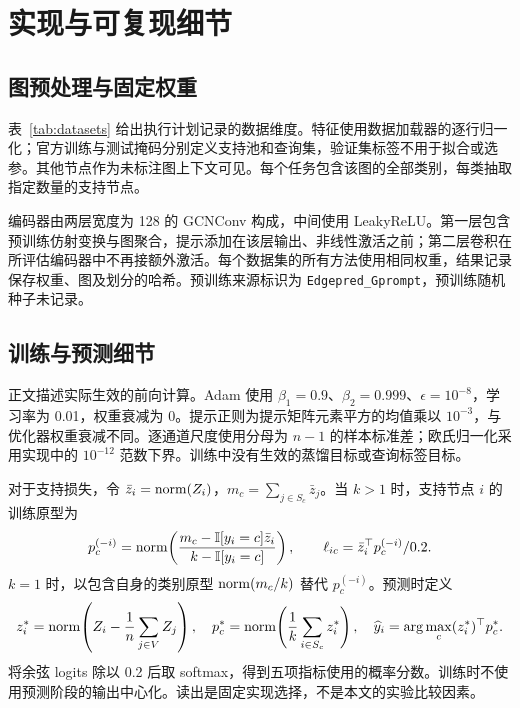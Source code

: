\section{实现与可复现细节}
\label{app:protocol}
\subsection{图预处理与固定权重}
表~\ref{tab:datasets} 给出执行计划记录的数据维度。特征使用数据加载器的逐行归一化；官方训练与测试掩码分别定义支持池和查询集，验证集标签不用于拟合或选参。其他节点作为未标注图上下文可见。每个任务包含该图的全部类别，每类抽取指定数量的支持节点。


编码器由两层宽度为 128 的 GCNConv 构成，中间使用 LeakyReLU。第一层包含预训练仿射变换与图聚合，提示添加在该层输出、非线性激活之前；第二层卷积在所评估编码器中不再接额外激活。每个数据集的所有方法使用相同权重，结果记录保存权重、图及划分的哈希。预训练来源标识为 \texttt{Edgepred\_Gprompt}，预训练随机种子未记录。

\subsection{训练与预测细节}
正文描述实际生效的前向计算。Adam 使用 $\beta_1=0.9$、$\beta_2=0.999$、$\epsilon=10^{-8}$，学习率为 0.01，权重衰减为 0。提示正则为提示矩阵元素平方的均值乘以 $10^{-3}$，与优化器权重衰减不同。逐通道尺度使用分母为 $n-1$ 的样本标准差；欧氏归一化采用实现中的 $10^{-12}$ 范数下界。训练中没有生效的蒸馏目标或查询标签目标。

对于支持损失，令 $\bar z_i=\operatorname{norm}\!\left(Z_i\right)$，$m_c=\sum_{j\in S_c}\bar z_j$。当 $k>1$ 时，支持节点 $i$ 的训练原型为
\begin{equation}
p_c^{(-i)}=\operatorname{norm}\!\left(\frac{m_c-\mathbb I[y_i=c]\bar z_i}{k-\mathbb I[y_i=c]}\right),\qquad
\ell_{ic}=\bar z_i^\top p_c^{(-i)}/0.2.
\label{eq:loo}
\end{equation}
$k=1$ 时，以包含自身的类别原型 $\operatorname{norm}\!\left(m_c/k\right)$ 替代 $p_c^{(-i)}$。预测时定义
\begin{equation}
z_i^*=\operatorname{norm}\!\left(Z_i-\frac1n\sum_{j\in V}Z_j\right),\quad
p_c^*=\operatorname{norm}\!\left(\frac1k\sum_{i\in S_c}z_i^*\right),\quad
\widehat y_i=\arg\max_c (z_i^*)^\top p_c^*.
\label{eq:predict}
\end{equation}
将余弦 logits 除以 0.2 后取 softmax，得到五项指标使用的概率分数。训练时不使用预测阶段的输出中心化。读出是固定实现选择，不是本文的实验比较因素。

